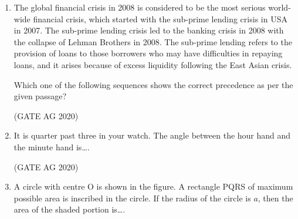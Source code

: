 \documentclass[journal]{IEEEtran}
\begin{document}
\begin{enumerate}
\medskip

\item 
The global financial crisis in 2008 is considered to be the most serious world-wide financial crisis, which started with the sub-prime lending crisis in USA in 2007. The sub-prime lending crisis led to the banking crisis in 2008 with the collapse of Lehman Brothers in 2008. The sub-prime lending refers to the provision of loans to those borrowers who may have difficulties in repaying loans, and it arises because of excess liquidity following the East Asian crisis.

Which one of the following sequences shows the correct precedence as per the given passage?
\begin{enumerate}
\end{enumerate}
\hfill(GATE AG 2020)\\

\medskip

\item 
It is quarter past three in your watch. The angle between the hour hand and the minute hand is\dots.

\begin{enumerate}
\end{enumerate}
\hfill(GATE AG 2020)\\

\medskip

\item 
A circle with centre O is shown in the figure. A rectangle PQRS of maximum possible area is inscribed in the circle. If the radius of the circle is $a$, then the area of the shaded portion is\dots.


\end{enumerate}
\end{document}
